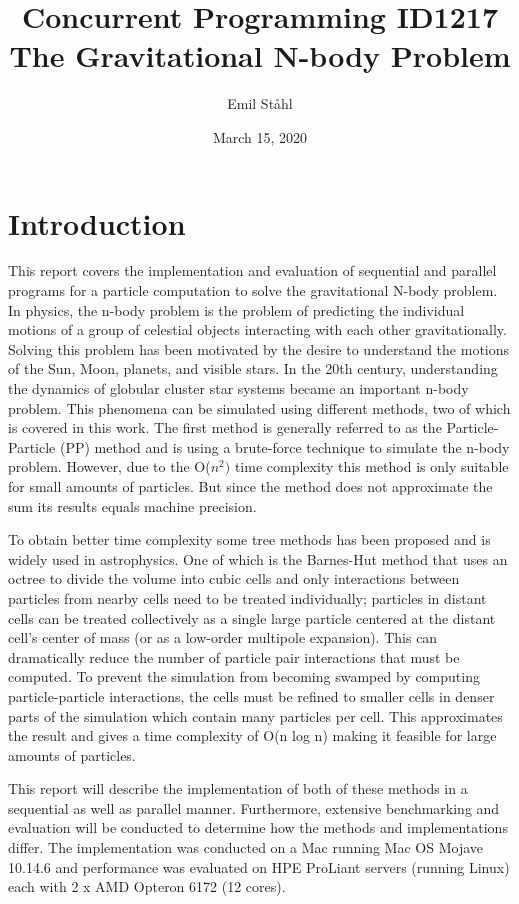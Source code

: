 \documentclass{article}
\title{\textbf{Concurrent Programming ID1217} \\ 
\textbf{The Gravitational N-body Problem}}
\author{Emil Ståhl}
\date{March 15, 2020}
\begin{document}
\maketitle

\section{Introduction}

This report covers the implementation and evaluation of sequential and parallel programs for a particle computation to solve the gravitational N-body problem. In physics, the n-body problem is the problem of predicting the individual motions of a group of celestial objects interacting with each other gravitationally. Solving this problem has been motivated by the desire to understand the motions of the Sun, Moon, planets, and visible stars. In the 20th century, understanding the dynamics of globular cluster star systems became an important n-body problem. This phenomena can be simulated using different methods, two of which is covered in this work. The first method is generally referred to as the Particle-Particle (PP) method and is using a brute-force technique to simulate the n-body problem. However, due to the O(\(n^2)\) time complexity this method is only suitable for small amounts of particles. But since the method does not approximate the sum its results equals machine precision. 

To obtain better time complexity some tree methods has been proposed and is widely used in astrophysics. One of which is the Barnes-Hut method that uses an octree to divide the volume into cubic cells and only interactions between particles from nearby cells need to be treated individually; particles in distant cells can be treated collectively as a single large particle centered at the distant cell's center of mass (or as a low-order multipole expansion). This can dramatically reduce the number of particle pair interactions that must be computed. To prevent the simulation from becoming swamped by computing particle-particle interactions, the cells must be refined to smaller cells in denser parts of the simulation which contain many particles per cell. This approximates the result and gives a time complexity of O(n log n) making it feasible for large amounts of particles. 

This report will describe the implementation of both of these methods in a sequential as well as parallel manner. Furthermore, extensive benchmarking and evaluation will be conducted to determine how the methods and implementations differ. The implementation was conducted on a Mac running Mac OS Mojave 10.14.6 and performance was evaluated on HPE ProLiant servers (running Linux) each with 2 x AMD Opteron 6172 (12 cores).
\end{document}
